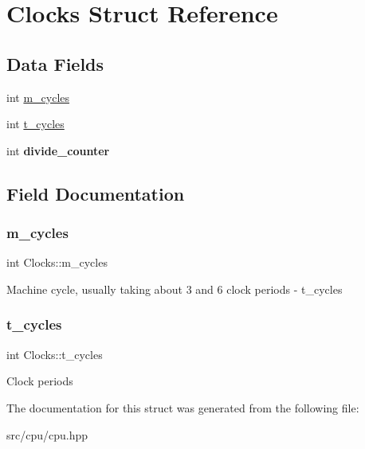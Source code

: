 \hypertarget{structClocks}{}\section{Clocks Struct Reference}
\label{structClocks}
\subsection*{Data Fields}
\begin{DoxyCompactItemize}
\item 
int \mbox{\hyperlink{structClocks_a154d63c216eca30ecbaea0b3a103b6eb}{m\+\_\+cycles}}
\item 
int \mbox{\hyperlink{structClocks_a0cdb6bcb6d6802d3b04162ea37b0cbfe}{t\+\_\+cycles}}
\item 
\mbox{\label{structClocks_aee9b586038cb14b0b2e795b200b59510}} 
int {\bfseries divide\+\_\+counter}
\end{DoxyCompactItemize}


\subsection{Field Documentation}
\mbox{\label{structClocks_a154d63c216eca30ecbaea0b3a103b6eb}} 
\subsubsection{\texorpdfstring{m\+\_\+cycles}{m\_cycles}}
{\footnotesize\ttfamily int Clocks\+::m\+\_\+cycles}

Machine cycle, usually taking about 3 and 6 clock periods -\/ t\+\_\+cycles \mbox{\label{structClocks_a0cdb6bcb6d6802d3b04162ea37b0cbfe}} 
\subsubsection{\texorpdfstring{t\+\_\+cycles}{t\_cycles}}
{\footnotesize\ttfamily int Clocks\+::t\+\_\+cycles}

Clock periods 

The documentation for this struct was generated from the following file\+:\begin{DoxyCompactItemize}
\item 
src/cpu/cpu.\+hpp\end{DoxyCompactItemize}
